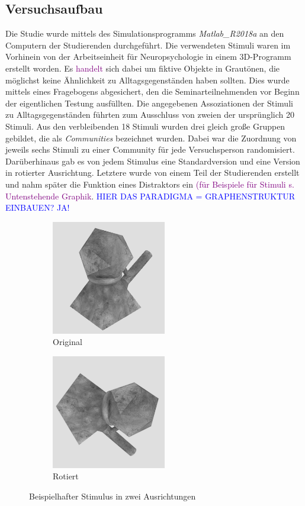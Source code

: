 \documentclass[preprint,12pt]{elsarticle}
\begin{document}
\subsection{Versuchsaufbau}
Die Studie wurde mittels des Simulationsprogramms \textit{Matlab\_R2018a} an den Computern der Studierenden durchgeführt. Die verwendeten Stimuli waren im Vorhinein von der Arbeitseinheit für Neuropsychologie in einem 3D-Programm  erstellt worden. Es \textcolor{purple}{handelt} sich dabei um fiktive Objekte in Grautönen, die möglichst keine Ähnlichkeit zu Alltagsgegenständen haben sollten. Dies wurde mittels eines Fragebogens abgesichert, den die Seminarteilnehmenden vor Beginn der eigentlichen Testung ausfüllten. Die angegebenen Assoziationen der Stimuli zu Alltagsgegenständen führten zum Ausschluss von zweien der ursprünglich 20 Stimuli.
Aus den verbleibenden 18 Stimuli wurden drei gleich große Gruppen gebildet, die als \textit{Communities} bezeichnet wurden. Dabei war die Zuordnung von jeweils sechs Stimuli zu einer Community für jede Versuchsperson randomisiert.
Darüberhinaus gab es von jedem Stimulus eine Standardversion und eine Version in rotierter Ausrichtung. Letztere wurde von einem Teil der Studierenden erstellt und nahm später die Funktion eines Distraktors ein \textcolor{purple}{(für Beispiele für Stimuli s. Untenstehende Graphik}.
\textcolor{blue}{HIER DAS PARADIGMA = GRAPHENSTRUKTUR EINBAUEN? JA!}

\begin{figure}[h]
\begin{subfigure}{0.5\textwidth}
\includegraphics[width=0.9\linewidth, height=5cm]{Objekt11A.png}
\caption{Original}
\label{fig:subim1}
\end{subfigure}
\begin{subfigure}{0.5\textwidth}
\includegraphics[width=0.9\linewidth, height=5cm]{Objekt11B.png}
\caption{Rotiert}
\label{fig:subim2}
\end{subfigure}

\caption{Beispielhafter Stimulus in zwei Ausrichtungen}
\label{fig:image2}
\end{figure}
\end{document}
